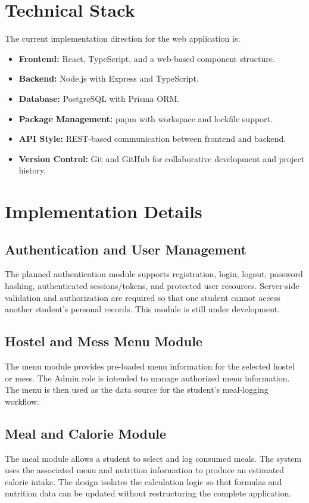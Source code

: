 \documentclass[11pt,a4paper]{article}
\begin{document}
\section{Technical Stack}
The current implementation direction for the web application is:
\begin{itemize}
    \item \textbf{Frontend:} React, TypeScript, and a web-based component structure.
    \item \textbf{Backend:} Node.js with Express and TypeScript.
    \item \textbf{Database:} PostgreSQL with Prisma ORM.
    \item \textbf{Package Management:} pnpm with workspace and lockfile support.
    \item \textbf{API Style:} REST-based communication between frontend and backend.
    \item \textbf{Version Control:} Git and GitHub for collaborative development and project history.
\end{itemize}

\section{Implementation Details}
\subsection{Authentication and User Management}
The planned authentication module supports registration, login, logout, password hashing, authenticated sessions/tokens, and protected user resources. Server-side validation and authorization are required so that one student cannot access another student's personal records. This module is still under development.

\subsection{Hostel and Mess Menu Module}
The menu module provides pre-loaded menu information for the selected hostel or mess. The Admin role is intended to manage authorized menu information. The menu is then used as the data source for the student's meal-logging workflow.

\subsection{Meal and Calorie Module}
The meal module allows a student to select and log consumed meals. The system uses the associated menu and nutrition information to produce an estimated calorie intake. The design isolates the calculation logic so that formulas and nutrition data can be updated without restructuring the complete application.
\end{document}
